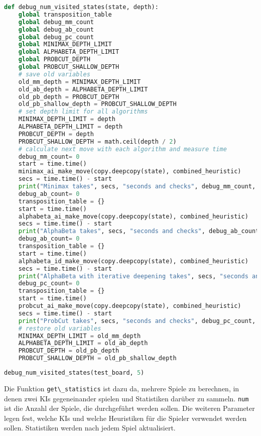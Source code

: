 \begin{lstlisting}[language=Python]
def debug_num_visited_states(state, depth):
    global transposition_table
    global debug_mm_count
    global debug_ab_count
    global debug_pc_count
    global MINIMAX_DEPTH_LIMIT
    global ALPHABETA_DEPTH_LIMIT
    global PROBCUT_DEPTH
    global PROBCUT_SHALLOW_DEPTH
    # save old variables
    old_mm_depth = MINIMAX_DEPTH_LIMIT
    old_ab_depth = ALPHABETA_DEPTH_LIMIT
    old_pb_depth = PROBCUT_DEPTH
    old_pb_shallow_depth = PROBCUT_SHALLOW_DEPTH
    # set depth limit for all algorithms
    MINIMAX_DEPTH_LIMIT = depth
    ALPHABETA_DEPTH_LIMIT = depth
    PROBCUT_DEPTH = depth
    PROBCUT_SHALLOW_DEPTH = math.ceil(depth / 2)
    # calculate next move with each algorithm and measure time
    debug_mm_count= 0
    start = time.time()
    minimax_ai_make_move(copy.deepcopy(state), combined_heuristic)
    secs = time.time() - start
    print("Minimax takes", secs, "seconds and checks", debug_mm_count, "substates")
    debug_ab_count= 0
    transposition_table = {}
    start = time.time()
    alphabeta_ai_make_move(copy.deepcopy(state), combined_heuristic)
    secs = time.time() - start
    print("AlphaBeta takes", secs, "seconds and checks", debug_ab_count, "substates")
    debug_ab_count= 0
    transposition_table = {}
    start = time.time()
    alphabeta_id_make_move(copy.deepcopy(state), combined_heuristic)
    secs = time.time() - start
    print("AlphaBeta with iterative deepening takes", secs, "seconds and checks", debug_ab_count, "substates")
    debug_pc_count= 0
    transposition_table = {}
    start = time.time()
    probcut_ai_make_move(copy.deepcopy(state), combined_heuristic)
    secs = time.time() - start
    print("ProbCut takes", secs, "seconds and checks", debug_pc_count, "substates")
    # restore old variables
    MINIMAX_DEPTH_LIMIT = old_mm_depth
    ALPHABETA_DEPTH_LIMIT = old_ab_depth
    PROBCUT_DEPTH = old_pb_depth
    PROBCUT_SHALLOW_DEPTH = old_pb_shallow_depth
\end{lstlisting}

\begin{lstlisting}[language=Python]
debug_num_visited_states(test_board, 5)
\end{lstlisting}

Die Funktion \passthrough{\lstinline!get\_statistics!} ist dazu da,
mehrere Spiele zu berechnen, in denen zwei KIs gegeneinander spielen und
Statistiken darüber zu sammeln. \passthrough{\lstinline!num!} ist die
Anzahl der Spiele, die durchgeführt werden sollen. Die weiteren
Parameter legen fest, welche KIs und welche Heuristiken für die Spieler
verwendet werden sollen. Statistiken werden nach jedem Spiel
aktualisiert.

